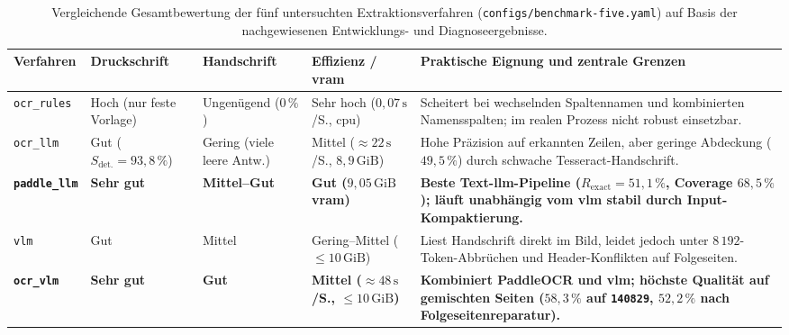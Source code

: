 \begin{table}[htbp]
  \centering
  \caption[Vergleichende Gesamtbewertung der fünf untersuchten Extraktionsverfahren]{Vergleichende Gesamtbewertung der fünf untersuchten Extraktionsverfahren (\texttt{configs/benchmark-five.yaml}) auf Basis der nachgewiesenen Entwicklungs- und Diagnoseergebnisse.}
  \label{tab:gesamtbewertung}
  \footnotesize
  \setlength{\tabcolsep}{4pt}
  \begin{tabularx}{\textwidth}{@{}>{\raggedright\arraybackslash}p{} >{\raggedright\arraybackslash}p{} >{\raggedright\arraybackslash}p{} >{\raggedright\arraybackslash}p{} >{\raggedright\arraybackslash}X@{}}
    \toprule
    \textbf{Verfahren} & \textbf{Druckschrift} & \textbf{Handschrift} & \textbf{Effizienz / \ac{vram}} & \textbf{Praktische Eignung und zentrale Grenzen} \\
    \midrule
    \texttt{ocr\_rules} & Hoch (nur feste Vorlage) & Ungenügend ($0\,\%$) & Sehr hoch ($0{,}07\,\mathrm{s}$/S., \ac{cpu}) & Scheitert bei wechselnden Spaltennamen und kombinierten Namensspalten; im realen Prozess nicht robust einsetzbar. \\
    \addlinespace[3pt]
    \texttt{ocr\_llm} & Gut ($S_{\mathrm{det.}} = 93{,}8\,\%$) & Gering (viele leere Antw.) & Mittel ($\approx 22\,\mathrm{s}$/S., $8{,}9\,\text{GiB}$) & Hohe Präzision auf erkannten Zeilen, aber geringe Abdeckung ($49{,}5\,\%$) durch schwache Tesseract-Handschrift. \\
    \addlinespace[3pt]
    \textbf{\texttt{paddle\_llm}} & \textbf{Sehr gut} & \textbf{Mittel--Gut} & \textbf{Gut ($9{,}05\,\text{GiB}$ \ac{vram})} & \textbf{Beste Text-\ac{llm}-Pipeline ($R_{\mathrm{exact}} = 51{,}1\,\%$, Coverage $68{,}5\,\%$); läuft unabhängig vom \ac{vlm} stabil durch Input-Kompaktierung.} \\
    \addlinespace[3pt]
    \texttt{vlm} & Gut & Mittel & Gering--Mittel ($\le 10\,\text{GiB}$) & Liest Handschrift direkt im Bild, leidet jedoch unter $8\,192$-Token-Abbrüchen und Header-Konflikten auf Folgeseiten. \\
    \addlinespace[3pt]
    \textbf{\texttt{ocr\_vlm}} & \textbf{Sehr gut} & \textbf{Gut} & \textbf{Mittel ($\approx 48\,\mathrm{s}$/S., $\le 10\,\text{GiB}$)} & \textbf{Kombiniert PaddleOCR und \ac{vlm}; höchste Qualität auf gemischten Seiten ($58{,}3\,\%$ auf \texttt{140829}, $52{,}2\,\%$ nach Folgeseitenreparatur).} \\
    \bottomrule
  \end{tabularx}
\end{table}
